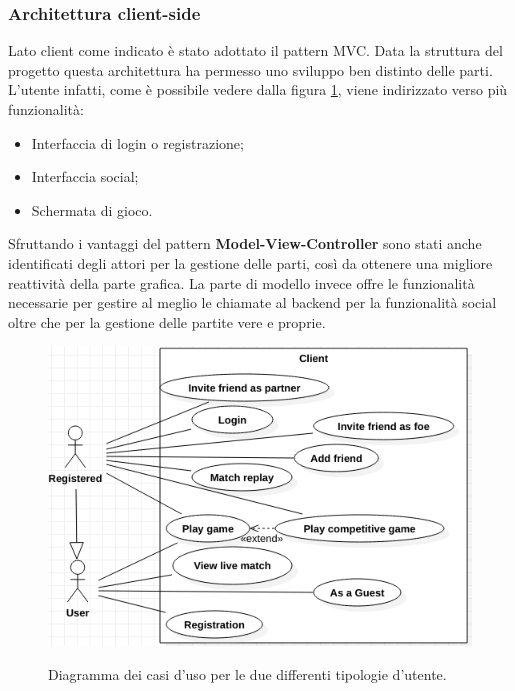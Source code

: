             \subsubsection{Architettura client-side}\label{subsub:architecture:client}
            Lato client come indicato è stato adottato il pattern MVC. Data la struttura del progetto questa architettura ha permesso uno sviluppo ben distinto delle parti.
            \\
            L'utente infatti, come è possibile vedere dalla figura \ref{fig:UserUseCaseDiagram}, viene indirizzato verso più funzionalità:
            \begin{itemize}
             \item Interfaccia di login o registrazione;
             \item Interfaccia social;
             \item Schermata di gioco.
            \end{itemize}
            Sfruttando i vantaggi del pattern \textbf{Model-View-Controller} sono stati anche identificati degli attori per la gestione delle parti, così da ottenere una migliore reattività della parte grafica.
            La parte di modello invece offre le funzionalità necessarie per gestire al meglio le chiamate al backend per la funzionalità social oltre che per la gestione delle partite vere e proprie.


	     \begin{figure}[!h]
                \includegraphics[scale=0.7]{images/UserUseCaseDiagram.png}
                \label{fig:UserUseCaseDiagram}
                \caption{Diagramma dei casi d'uso per le due differenti tipologie d'utente.}
            \end{figure}




